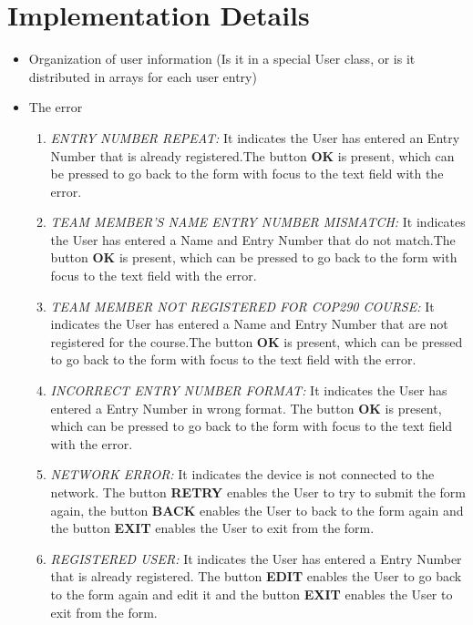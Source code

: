 \documentclass[12pt]{article}
\begin{document}
\section{Implementation Details}

\begin{itemize}
\item Organization of user information (Is it in a special User class, or is it distributed in arrays for each user entry)
\item The error
\begin{enumerate}
            \item \textit{ENTRY NUMBER REPEAT:} It indicates the User has entered an Entry Number that is already registered.The button \textbf{OK} is present, which can be pressed to go back to the form with focus to the text field with the error.
            
            \item \textit{TEAM MEMBER'S NAME ENTRY NUMBER MISMATCH:} It indicates the User has entered a Name and Entry Number that do not match.The button \textbf{OK} is present, which can be pressed to go back to the form with focus to the text field with the error. 
            
            \item \textit{TEAM MEMBER NOT REGISTERED FOR COP290 COURSE:} It indicates the User has entered a Name and Entry Number that are not registered for the course.The button \textbf{OK} is present, which can be pressed to go back to the form with focus to the text field with the error.
            
            \item \textit{INCORRECT ENTRY NUMBER FORMAT:} It indicates the User has entered a Entry Number in wrong format. The button \textbf{OK} is present, which can be pressed to go back to the form with focus to the text field with the error.
            \item \textit{NETWORK ERROR:} It indicates the device is not connected to the network. The button \textbf{RETRY} enables the User to try to submit the form again, the button \textbf{BACK} enables the User to back to the form again and the button \textbf{EXIT} enables the User to exit from the form.
            \item \textit{REGISTERED USER:} It indicates the User has entered a Entry Number that is already registered. The button \textbf{EDIT} enables the User to go back to the form again and edit it and the button \textbf{EXIT} enables the User to exit from the form.
            


\end{enumerate}
\end{itemize}
\end{document}
